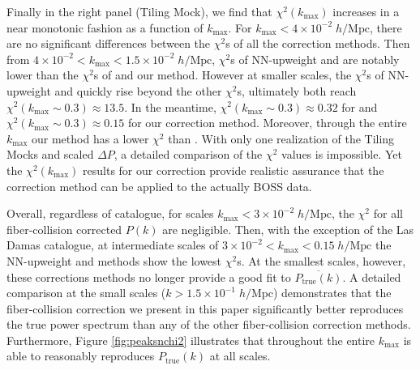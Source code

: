 \documentclass{emulateapj}
\begin{document}
Finally in the right panel (Tiling Mock), we find that $\chi^2(k_\mathrm{max})$ increases in a near monotonic fashion as a function of $k_\mathrm{max}$. For $k_\mathrm{max} < 4\times10^{-2} \; h/\mathrm{Mpc}$, there are no significant differences between the $\chi^2$s of all the correction methods. Then from $4\times10^{-2} < k_\mathrm{max} < 1.5\times 10^{-2} \; h/\mathrm{Mpc}$, $\chi^2$s of NN-upweight and \cite{Beutler:2014aa} are notably lower than the $\chi^2$s of \cite{Gil-Marin:2014aa} and our method. However at smaller scales, the $\chi^2$s of NN-upweight and \cite{Beutler:2014aa} quickly rise beyond the other $\chi^2$s, ultimately both reach $\chi^2(k_\mathrm{max} \sim 0.3) \approx 13.5$. In the meantime, $\chi^2(k_\mathrm{max} \sim 0.3) \approx 0.32$ for \cite{Gil-Marin:2014aa} and $\chi^2(k_\mathrm{max} \sim 0.3) \approx 0.15$ for our correction method. Moreover, through the entire $k_\mathrm{max}$ our method has a lower $\chi^2$ than \cite{Gil-Marin:2014aa}. With only one realization of the Tiling Mocks and scaled $\Delta P$, a detailed comparison of the $\chi^2$ values is impossible. Yet the $\chi^2(k_\mathrm{max})$ results for our correction provide realistic assurance that the correction method can be applied to the actually BOSS data.

Overall, regardless of catalogue, for scales $k_\mathrm{max} < 3 \times 10^{-2} \;h/\mathrm{Mpc}$, the $\chi^2$ for all fiber-collision corrected $P(k)$ are negligible. Then, with the exception of the Las Damas catalogue, at intermediate scales of $3 \times 10^{-2} < k_\mathrm{max} < 0.15 \; h/\mathrm{Mpc}$ the NN-upweight and \cite{Beutler:2014aa} methods show the lowest $\chi^2$s. At the smallest scales, however, these corrections methods no longer provide a good fit to $\overline{P_\mathrm{true}(k)}$. A detailed comparison at the small scales ($k > 1.5 \times 10^{-1} \;h/\mathrm{Mpc}$) demonstrates that the fiber-collision correction we present in this paper significantly better reproduces the true power spectrum than any of the other fiber-collision correction methods. Furthermore, Figure \ref{fig:peaksnchi2} illustrates that throughout the entire $k_\mathrm{max}$ is able to reasonably reproduces $P_\mathrm{true}(k)$ at all scales. 

\end{document}
